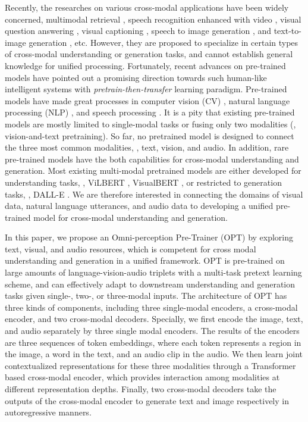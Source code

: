 \documentclass[10pt,twocolumn,letterpaper]{article}
\begin{document}
Recently, the researches on various cross-modal applications have been widely concerned, \eg multimodal retrieval \cite{wang2017adversarial,gordo2017end}, speech recognition enhanced with video \cite{ghorbani2020,palaskar2018}, visual question answering \cite{antol2015,yu2019deep}, visual captioning \cite{you2016image,mao2014deep}, speech to image generation \cite{wang20s2igan,li20direct}, and text-to-image generation \cite{reed2016,xu2018attngan}, etc. However, they are proposed to specialize in certain types of cross-modal understanding or generation tasks, and cannot establish general knowledge for unified processing. Fortunately, recent advances on pre-trained models have pointed out a promising direction towards such human-like intelligent systems with \textit{pretrain-then-transfer} learning paradigm. Pre-trained models have made great processes in computer vision (CV) \cite{he2016deep,densenet}, natural language processing (NLP) \cite{bert,xlnet}, and speech processing \cite{dahl2011}. It is a pity that existing pre-trained models are mostly limited to single-modal tasks or fusing only two modalities (\eg, vision-and-text pretraining). So far, no pretrained model is designed to connect the three most common modalities, \ie, text, vision, and audio. In addition, rare pre-trained models have the both capabilities for cross-modal understanding and generation. Most existing multi-modal pretrained models are either developed for understanding tasks, \eg, ViLBERT \cite{lvilbert}, VisualBERT \cite{visualbert}, or restricted to generation tasks, \eg, DALL-E \cite{dalle}. We are therefore interested in connecting the domains of visual data, natural language utterances, and audio data to developing a unified pre-trained model for cross-modal understanding and generation.

In this paper, we propose an Omni-perception Pre-Trainer (OPT) by exploring text, visual, and audio resources, which is competent for cross modal understanding and generation in a unified framework. OPT is pre-trained on large amounts of language-vision-audio triplets with a multi-task pretext learning scheme, and can effectively adapt to downstream understanding and generation tasks given single-, two-, or three-modal inputs. The architecture of OPT has three kinds of components, including three single-modal encoders, a cross-modal encoder, and two cross-modal decoders. Specially, we first encode the image, text, and audio separately by three single modal encoders. The results of the encoders are three sequences of token embeddings, where each token represents a region in the image, a word in the text, and an audio clip in the audio. We then learn joint contextualized representations for these three modalities through a Transformer based cross-modal encoder, which provides interaction among modalities at different representation depths. Finally, two cross-modal decoders take the outputs of the cross-modal encoder to generate text and image respectively in autoregressive manners.
\end{document}

